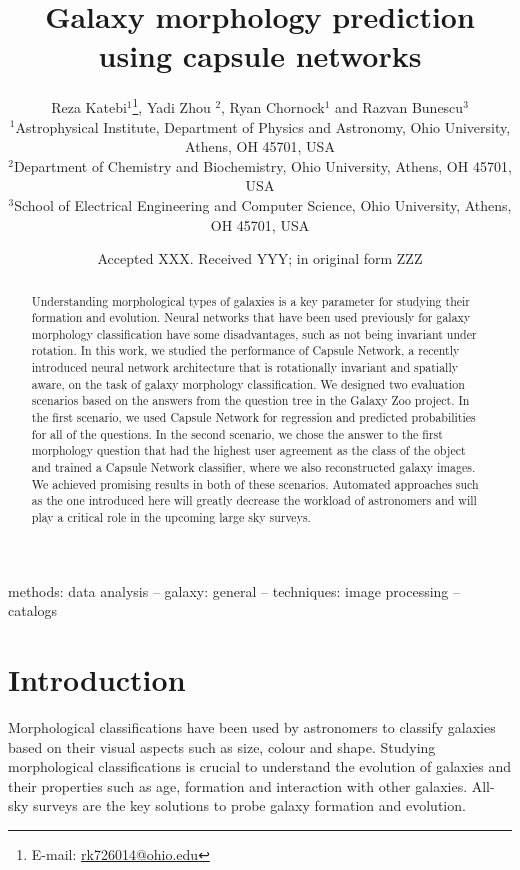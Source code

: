 \documentclass[a4paper,fleqn,usenatbib]{mnras}
\title[CapsNets for morphological classification]{Galaxy morphology prediction using capsule networks}
\author[Katebi. et al]{
Reza Katebi$^{1}$\thanks{E-mail: \url{rk726014@ohio.edu}},
Yadi Zhou $^{2}$,
Ryan Chornock$^{1}$
and Razvan Bunescu$^{3}$
\\
$^{1}$Astrophysical Institute, Department of Physics and Astronomy, Ohio University, Athens, OH 45701, USA\\
$^{2}$Department of Chemistry and Biochemistry, Ohio University, Athens, OH 45701, USA\\
$^{3}$School of Electrical Engineering and Computer Science, Ohio University, Athens, OH 45701, USA 
}
\date{Accepted XXX. Received YYY; in original form ZZZ}
\begin{document}
\label{firstpage}
\pagerange{\pageref{firstpage}--\pageref{lastpage}}
\maketitle

\begin{abstract}
Understanding morphological types of galaxies is a key parameter for studying their formation and evolution. Neural networks that have been used previously for galaxy morphology classification have some disadvantages, such as not being invariant under rotation. In this work, we studied the performance of Capsule Network, a recently introduced neural network architecture that is rotationally invariant and spatially aware, on the task of galaxy morphology classification. We designed two evaluation scenarios based on the answers from the question tree in the Galaxy Zoo project. In the first scenario, we used Capsule Network for regression and predicted probabilities for all of the questions. In the second scenario, we chose the answer to the first morphology question that had the highest user agreement as the class of the object and trained a Capsule Network classifier, where we also reconstructed galaxy images. We achieved promising results in both of these scenarios. Automated approaches such as the one introduced here will greatly decrease the workload of astronomers and will play a critical role in the upcoming large sky surveys.



\end{abstract}

\begin{keywords}
methods: data analysis -- galaxy: general -- techniques: image processing  -- catalogs  
\end{keywords}



\section{Introduction}
Morphological classifications have been used by astronomers to classify galaxies based on their visual aspects such as size, colour and shape. Studying morphological classifications is crucial to understand the evolution of galaxies and their properties such as age, formation and interaction with other galaxies. All-sky surveys are the key solutions to probe galaxy formation and evolution. 
 
\end{document}
